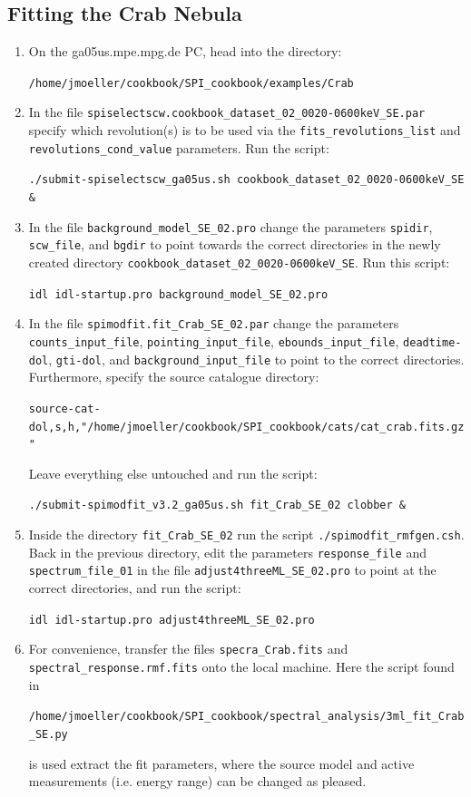 \documentclass{article}
\begin{document}
\subsection{Fitting the Crab Nebula} \label{Spimodfit crab steps}

\begin{enumerate}
    \item On the ga05us.mpe.mpg.de PC, head into the directory:
    
    \verb|/home/jmoeller/cookbook/SPI_cookbook/examples/Crab|

    \item \label{scw select} In the file \verb|spiselectscw.cookbook_dataset_02_0020-0600keV_SE.par| specify which revolution(s) is to be used via the \verb|fits_revolutions_list| and \verb|revolutions_cond_value| parameters. Run the script:
    
    \verb|./submit-spiselectscw_ga05us.sh cookbook_dataset_02_0020-0600keV_SE &|

    \item \label{step background} In the file \verb|background_model_SE_02.pro| change the parameters \verb|spidir|, \verb|scw_file|, and \verb|bgdir| to point towards the correct directories in the newly created directory \verb|cookbook_dataset_02_0020-0600keV_SE|. Run this script: 
    
    \verb|idl idl-startup.pro background_model_SE_02.pro|

    \item \label{Source directory} In the file \verb|spimodfit.fit_Crab_SE_02.par| change the parameters \verb|counts_input_file|, \verb|pointing_input_file|, \verb|ebounds_input_file|, \verb|deadtime-dol|, \verb|gti-dol|, and \verb|background_input_file| to point to the correct directories. Furthermore, specify the source catalogue directory:
    
    \verb|source-cat-dol,s,h,"/home/jmoeller/cookbook/SPI_cookbook/cats/cat_crab.fits.gz"|

    Leave everything else untouched and run the script:

    \verb|./submit-spimodfit_v3.2_ga05us.sh fit_Crab_SE_02 clobber &|

    \item \label{Spectrum file} Inside the directory \verb|fit_Crab_SE_02| run the script \verb|./spimodfit_rmfgen.csh|. Back in the previous directory, edit the parameters \verb|response_file| and \verb|spectrum_file_01| in the file \verb|adjust4threeML_SE_02.pro| to point at the correct directories, and run the script:
    
    \verb|idl idl-startup.pro adjust4threeML_SE_02.pro|

    \item For convenience, transfer the files \verb|specra_Crab.fits| and \verb|spectral_response.rmf.fits| onto the local machine. Here the script found in
    
    \verb|/home/jmoeller/cookbook/SPI_cookbook/spectral_analysis/3ml_fit_Crab_SE.py|
    
    is used extract the fit parameters, where the source model and active measurements (i.e. energy range) can be changed as pleased.
\end{enumerate}
\end{document}
